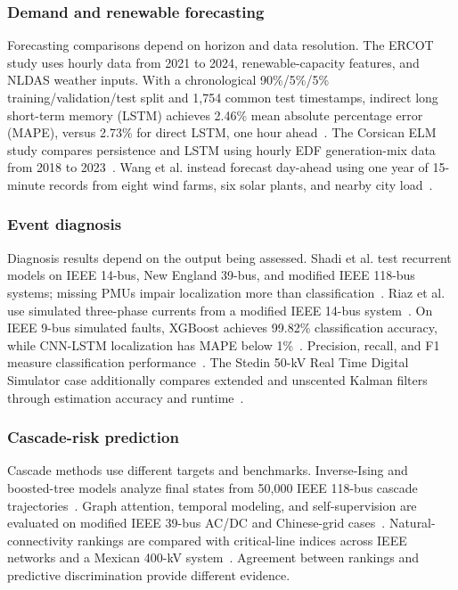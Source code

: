 \subsubsection{Demand and renewable forecasting}
Forecasting comparisons depend on horizon and data resolution. The ERCOT study uses hourly data from 2021 to 2024, renewable-capacity features, and NLDAS weather inputs. With a chronological 90\%/5\%/5\% training/validation/test split and 1,754 common test timestamps, indirect long short-term memory (LSTM) achieves 2.46\% mean absolute percentage error (MAPE), versus 2.73\% for direct LSTM, one hour ahead~\cite{S25}. The Corsican ELM study compares persistence and LSTM using hourly EDF generation-mix data from 2018 to 2023~\cite{S20}. Wang et al. instead forecast day-ahead using one year of 15-minute records from eight wind farms, six solar plants, and nearby city load~\cite{S24}.

\subsubsection{Event diagnosis}
Diagnosis results depend on the output being assessed. Shadi et al. test recurrent models on IEEE 14-bus, New England 39-bus, and modified IEEE 118-bus systems; missing PMUs impair localization more than classification~\cite{S11}. Riaz et al. use simulated three-phase currents from a modified IEEE 14-bus system~\cite{S16}. On IEEE 9-bus simulated faults, XGBoost achieves 99.82\% classification accuracy, while CNN-LSTM localization has MAPE below 1\%~\cite{S14}. Precision, recall, and F1 measure classification performance~\cite{S11}. The Stedin 50-kV Real Time Digital Simulator case additionally compares extended and unscented Kalman filters through estimation accuracy and runtime~\cite{S18}.

\subsubsection{Cascade-risk prediction}
Cascade methods use different targets and benchmarks. Inverse-Ising and boosted-tree models analyze final states from 50,000 IEEE 118-bus cascade trajectories~\cite{S02}. Graph attention, temporal modeling, and self-supervision are evaluated on modified IEEE 39-bus AC/DC and Chinese-grid cases~\cite{N02}. Natural-connectivity rankings are compared with critical-line indices across IEEE networks and a Mexican 400-kV system~\cite{S03}. Agreement between rankings and predictive discrimination provide different evidence.

